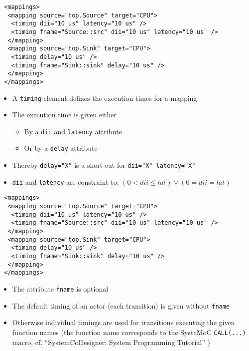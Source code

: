 \begin{frame}[fragile=singleslide]
\begin{lstlisting}
 <mappings>
  <mapping source="top.Source" target="CPU">
   <timing dii="10 us" latency="10 us" />
   <timing fname="Source::src" dii="10 us" latency="10 us" />
  </mapping>
  <mapping source="top.Sink" target="CPU">
   <timing delay="10 us" />
   <timing fname="Sink::sink" delay="10 us" />
  </mapping>
 </mappings>
\end{lstlisting}
\begin{itemize}
\item A \lstinline!timing! element defines the execution times for a mapping
\item The execution time is given either
\begin{itemize}
\item By a \lstinline!dii! and  \lstinline!latency! attribute
\item Or by a \lstinline!delay! attribute
\end{itemize}
\item Thereby \lstinline!delay="X"! is a short cut for \lstinline!dii="X" latency="X"!
\item \lstinline!dii! and \lstinline!latency! are constraint to: $(0 < dii \le lat) \vee (0=dii=lat)$
\end{itemize}
\end{frame}


\begin{frame}[fragile=singleslide]
\begin{lstlisting}
 <mappings>
  <mapping source="top.Source" target="CPU">
   <timing dii="10 us" latency="10 us" />
   <timing fname="Source::src" dii="10 us" latency="10 us" />
  </mapping>
  <mapping source="top.Sink" target="CPU">
   <timing delay="10 us" />
   <timing fname="Sink::sink" delay="10 us" />
  </mapping>
 </mappings>
\end{lstlisting}
\begin{itemize}
\item The attribute \lstinline!fname! is optional
\item The default timing of an actor (each transition) is given without \lstinline!fname!
\item Otherwise individual timings are used for transitions executing the given function names (the function name corresponds to the SysteMoC \lstinline!CALL(...)! macro, cf. ``SystemCoDesigner: System Programming Tutorial''
)
\end{itemize}
\end{frame}


